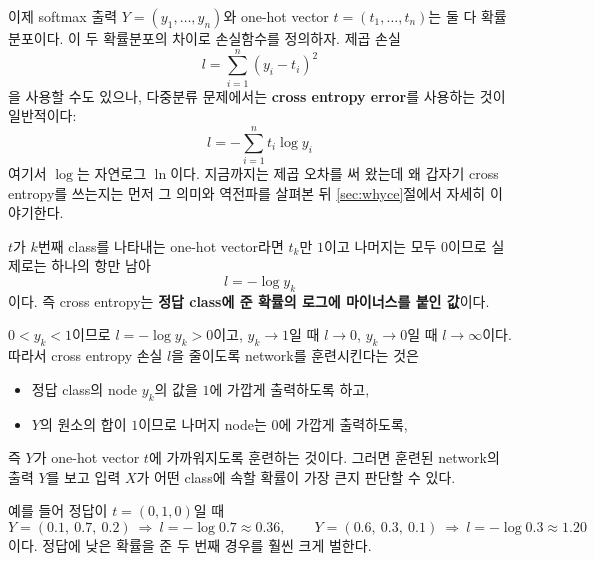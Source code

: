 \documentclass[11pt,a4paper]{article}
\begin{document}
이제 softmax 출력 $Y=(y_1,\ldots,y_n)$와 one-hot vector $t=(t_1,\ldots,t_n)$는 둘 다 확률분포이다.
이 두 확률분포의 차이로 손실함수를 정의하자.
제곱 손실
\[
l=\sum_{i=1}^{n}(y_i-t_i)^2
\]
을 사용할 수도 있으나, 다중분류 문제에서는 \textbf{cross entropy error}를 사용하는 것이 일반적이다:
\[
\boxed{
l=-\sum_{i=1}^{n}t_i\log y_i
}
\]
여기서 $\log$는 자연로그 $\ln$이다.
지금까지는 제곱 오차를 써 왔는데 왜 갑자기 cross entropy를 쓰는지는
먼저 그 의미와 역전파를 살펴본 뒤 \ref{sec:whyce}절에서 자세히 이야기한다.

$t$가 $k$번째 class를 나타내는 one-hot vector라면 $t_k$만 $1$이고 나머지는 모두 $0$이므로
실제로는 하나의 항만 남아
\[
l=-\log y_k
\]
이다. 즉 cross entropy는 \textbf{정답 class에 준 확률의 로그에 마이너스를 붙인 값}이다.

\begin{center}
\end{center}

$0<y_k<1$이므로 $l=-\log y_k>0$이고, $y_k\to1$일 때 $l\to0$, $y_k\to0$일 때 $l\to\infty$이다.
따라서 cross entropy 손실 $l$을 줄이도록 network를 훈련시킨다는 것은
\begin{itemize}[leftmargin=1.8em]
\item 정답 class의 node $y_k$의 값을 $1$에 가깝게 출력하도록 하고,
\item $Y$의 원소의 합이 $1$이므로 나머지 node는 $0$에 가깝게 출력하도록,
\end{itemize}
즉 $Y$가 one-hot vector $t$에 가까워지도록 훈련하는 것이다.
그러면 훈련된 network의 출력 $Y$를 보고 입력 $X$가 어떤 class에 속할 확률이 가장 큰지 판단할 수 있다.

예를 들어 정답이 $t=(0,1,0)$일 때
\[
Y=(0.1,\ 0.7,\ 0.2)\ \Rightarrow\ l=-\log0.7\approx0.36,
\qquad
Y=(0.6,\ 0.3,\ 0.1)\ \Rightarrow\ l=-\log0.3\approx1.20
\]
이다. 정답에 낮은 확률을 준 두 번째 경우를 훨씬 크게 벌한다.
\end{document}
